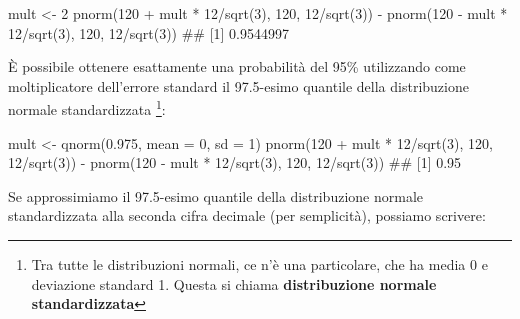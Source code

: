 \documentclass[a4paper,12pt,oneside]{book}
\newenvironment{Shaded}{\begin{snugshade}}{\end{snugshade}}
\newcommand{\DecValTok}[1]{#1}
\newcommand{\FloatTok}[1]{#1}
\newcommand{\SpecialCharTok}[1]{#1}
\newcommand{\DocumentationTok}[1]{#1}
\newcommand{\OtherTok}[1]{#1}
\newcommand{\FunctionTok}[1]{#1}
\newcommand{\AttributeTok}[1]{#1}
\newcommand{\NormalTok}[1]{#1}
\begin{document}
\begin{Shaded}
\begin{Highlighting}[]
\NormalTok{mult }\OtherTok{\textless{}{-}} \DecValTok{2}
\FunctionTok{pnorm}\NormalTok{(}\DecValTok{120} \SpecialCharTok{+}\NormalTok{ mult }\SpecialCharTok{*} \DecValTok{12}\SpecialCharTok{/}\FunctionTok{sqrt}\NormalTok{(}\DecValTok{3}\NormalTok{), }\DecValTok{120}\NormalTok{, }\DecValTok{12}\SpecialCharTok{/}\FunctionTok{sqrt}\NormalTok{(}\DecValTok{3}\NormalTok{)) }\SpecialCharTok{{-}} 
  \FunctionTok{pnorm}\NormalTok{(}\DecValTok{120} \SpecialCharTok{{-}}\NormalTok{ mult }\SpecialCharTok{*} \DecValTok{12}\SpecialCharTok{/}\FunctionTok{sqrt}\NormalTok{(}\DecValTok{3}\NormalTok{), }\DecValTok{120}\NormalTok{, }\DecValTok{12}\SpecialCharTok{/}\FunctionTok{sqrt}\NormalTok{(}\DecValTok{3}\NormalTok{))}
\DocumentationTok{\#\# [1] 0.9544997}
\end{Highlighting}
\end{Shaded}

È possibile ottenere esattamente una probabilità del 95\% utilizzando come moltiplicatore dell'errore standard il 97.5-esimo quantile della distribuzione normale standardizzata \footnote{Tra tutte le distribuzioni normali, ce n'è una particolare, che ha media 0 e deviazione standard 1. Questa si chiama \textbf{distribuzione normale standardizzata}}:

\begin{Shaded}
\begin{Highlighting}[]
\NormalTok{mult }\OtherTok{\textless{}{-}} \FunctionTok{qnorm}\NormalTok{(}\FloatTok{0.975}\NormalTok{, }\AttributeTok{mean =} \DecValTok{0}\NormalTok{, }\AttributeTok{sd =} \DecValTok{1}\NormalTok{)}
\FunctionTok{pnorm}\NormalTok{(}\DecValTok{120} \SpecialCharTok{+}\NormalTok{ mult }\SpecialCharTok{*} \DecValTok{12}\SpecialCharTok{/}\FunctionTok{sqrt}\NormalTok{(}\DecValTok{3}\NormalTok{), }\DecValTok{120}\NormalTok{, }\DecValTok{12}\SpecialCharTok{/}\FunctionTok{sqrt}\NormalTok{(}\DecValTok{3}\NormalTok{)) }\SpecialCharTok{{-}} 
  \FunctionTok{pnorm}\NormalTok{(}\DecValTok{120} \SpecialCharTok{{-}}\NormalTok{ mult }\SpecialCharTok{*} \DecValTok{12}\SpecialCharTok{/}\FunctionTok{sqrt}\NormalTok{(}\DecValTok{3}\NormalTok{), }\DecValTok{120}\NormalTok{, }\DecValTok{12}\SpecialCharTok{/}\FunctionTok{sqrt}\NormalTok{(}\DecValTok{3}\NormalTok{))}
\DocumentationTok{\#\# [1] 0.95}
\end{Highlighting}
\end{Shaded}

Se approssimiamo il 97.5-esimo quantile della distribuzione normale standardizzata alla seconda cifra decimale (per semplicità), possiamo scrivere:
\end{document}
